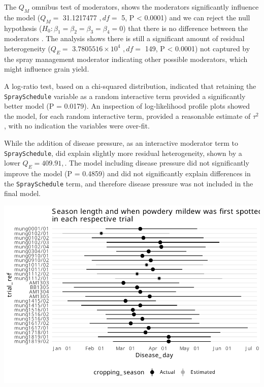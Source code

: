 \documentclass[agronomy,article,submit,moreauthors,pdftex]{mdpi}
\begin{document}
The \(Q_M\) omnibus test of moderators, shows the moderators
significantly influence the model (\(Q_M =\) 31.1217477 \(,df =\) 5, P
\textless{} 0.0001) and we can reject the null hypothesis
(\(H_0 : \beta_1 = \beta_2 = \beta_3 =\beta_4 = 0\)) that there is no
difference between the moderators \citep{Viechtbauer2010}. The analysis
shows there is still a significant amount of residual heterogeneity
(\(Q_E =\) \ensuremath{3.7805516\times 10^{4}} \(,df=\) 149, P
\textless{} 0.0001) not captured by the spray management moderator
indicating other possible moderators, which might influence grain yield.

A log-ratio test, based on a chi-squared distribution, indicated that
retaining the \texttt{SpraySchedule} variable as a random interactive
term provided a significantly better model (P = 0.0179). An inspection
of log-likelihood profile plots showed the model, for each random
interactive term, provided a reasonable estimate of \(\tau^2\), with no
indication the variables were over-fit.

While the addition of disease pressure, as an interactive moderator term
to \texttt{SpraySchedule}, did explain slightly more residual
heterogeneity, shown by a lower \(Q_E = 409.91,\). The model including
disease pressure did not significantly improve the model (P = 0.4859)
and did not significantly explain differences in the
\texttt{SpraySchedule} term, and therefore disease pressure was not
included in the final model.

\includegraphics{paper_files/figure-latex/Figure2-1.pdf}
\end{document}
